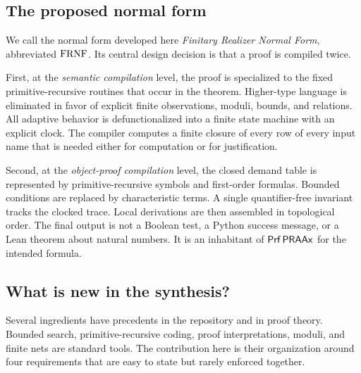 \subsection{The proposed normal form}

We call the normal form developed here \emph{Finitary Realizer Normal Form}, abbreviated
\(\mathrm{FRNF}\).  Its central design decision is that a proof is compiled twice.

First, at the \emph{semantic compilation} level, the proof is specialized to the fixed
primitive-recursive routines that occur in the theorem.  Higher-type language is
eliminated in favor of explicit finite observations, moduli, bounds, and relations.
All adaptive behavior is defunctionalized into a finite state machine with an explicit
clock.  The compiler computes a finite closure of every row of every input name that
is needed either for computation or for justification.

Second, at the \emph{object-proof compilation} level, the closed demand table is
represented by primitive-recursive symbols and first-order formulas.  Bounded
conditions are replaced by characteristic terms.  A single quantifier-free invariant
tracks the clocked trace.  Local derivations are then assembled in topological order.
The final output is not a Boolean test, a Python success message, or a Lean theorem
about natural numbers.  It is an inhabitant of \(\mathsf{Prf}\,\mathsf{PRAAx}\) for the intended
formula.

\subsection{What is new in the synthesis?}

Several ingredients have precedents in the repository and in proof theory.  Bounded
search, primitive-recursive coding, proof interpretations, moduli, and finite nets are
standard tools.  The contribution here is their organization around four requirements
that are easy to state but rarely enforced together.

